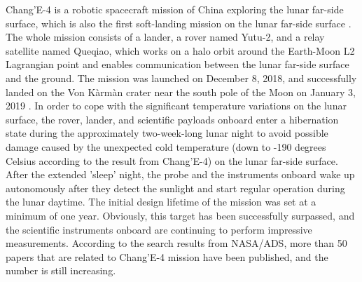 Chang'E-4 is a robotic spacecraft mission of China exploring the lunar far-side surface, which is also the first soft-landing mission on the lunar far-side surface \citep{Li2021SSRv}. The whole mission consists of a lander, a rover named Yutu-2, and a relay satellite named Queqiao, which works on a halo orbit around the Earth-Moon L2 Lagrangian point and enables communication between the lunar far-side surface and the ground. The mission was launched on December 8, 2018, and successfully landed on the Von K\`arm\`an crater near the south pole of the Moon on January 3, 2019 \citep{Wu2019NatGe}. In order to cope with the significant temperature variations on the lunar surface, the rover, lander, and scientific payloads onboard enter a hibernation state during the approximately two-week-long lunar night to avoid possible damage caused by the unexpected cold temperature (down to -190 degrees Celsius according to the result from Chang'E-4) on the lunar far-side surface. After the extended 'sleep' night, the probe and the instruments onboard wake up autonomously after they detect the sunlight and start regular operation during the lunar daytime. The initial design lifetime of the mission was set at a minimum of one year. Obviously, this target has been successfully surpassed, and the scientific instruments onboard are continuing to perform impressive measurements. According to the search results from NASA/ADS, more than 50 papers that are related to Chang'E-4 mission have been published, and the number is still increasing.

